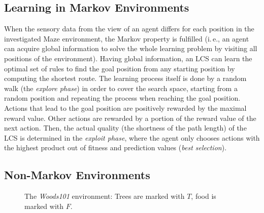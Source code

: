 \subsection{Learning in Markov Environments} %
\label{subsection:learning-markov}

When the sensory data from the view of an agent differs for each position in the investigated Maze environment, the Markov property is fulfilled (i.\,e., an agent can acquire global information to solve the whole learning problem by visiting all positions of the environment). Having global information, an LCS can learn the optimal set of rules to find the goal position from any starting position by computing the shortest route. The learning process itself is done by a random walk (the \emph{explore phase}) in order to cover the search space, starting from a random position and repeating the process when reaching the goal position. Actions that lead to the goal position are positively rewarded by the maximal reward value. Other actions are rewarded by a portion of the reward value of the next action. Then, the actual quality (the shortness of the path length) of the LCS is determined in the \emph{exploit phase}, where the agent only chooses actions with the highest product out of fitness and prediction values (\emph{best selection}).



\subsection{Non-Markov Environments}
\label{subsection:non-markov-environments}

\begin{figure}[ht]
  \hfill
  \hfill
  \caption{The \emph{Woods101} environment: Trees are marked with $T$, food is marked with $F$.}
  \label{figure:woods101}
\end{figure}

